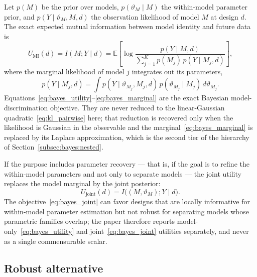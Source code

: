 Let $p(M)$ be the prior over models, $p(\vartheta_M \mid M)$ the within-model parameter prior, and $p(Y \mid \vartheta_M, M, d)$ the observation likelihood of model $M$ at design $d$. The exact expected mutual information between model identity and future data is
\begin{equation}
U_{\mathrm{MI}}(d)
= I(M;Y \mid d)
= \mathbb{E}\!\left[
\log \frac{p(Y \mid M, d)}{\sum_{j=1}^{K} p(M_j)\, p(Y \mid M_j, d)}
\right],
\label{eq:bayes_utility}
\end{equation}
where the marginal likelihood of model $j$ integrates out its parameters,
\begin{equation}
p(Y \mid M_j, d)
= \int p(Y \mid \vartheta_{M_j}, M_j, d)\, p(\vartheta_{M_j} \mid M_j)\, d\vartheta_{M_j}.
\label{eq:bayes_marginal}
\end{equation}
Equations~\eqref{eq:bayes_utility}--\eqref{eq:bayes_marginal} are the exact Bayesian model-discrimination objective. They are never reduced to the linear-Gaussian quadratic~\eqref{eq:kl_pairwise} here; that reduction is recovered only when the likelihood is Gaussian in the observable and the marginal~\eqref{eq:bayes_marginal} is replaced by its Laplace approximation, which is the second tier of the hierarchy of Section~\ref{subsec:bayes:nested}.

If the purpose includes parameter recovery --- that is, if the goal is to refine the within-model parameters and not only to separate models --- the joint utility replaces the model marginal by the joint posterior:
\begin{equation}
U_{\mathrm{joint}}(d) = I\bigl((M,\vartheta_M); Y \mid d\bigr).
\label{eq:bayes_joint}
\end{equation}
The objective~\eqref{eq:bayes_joint} can favor designs that are locally informative for within-model parameter estimation but not robust for separating models whose parametric families overlap; the paper therefore reports model-only~\eqref{eq:bayes_utility} and joint~\eqref{eq:bayes_joint} utilities separately, and never as a single commensurable scalar.

\subsection{Robust alternative}

